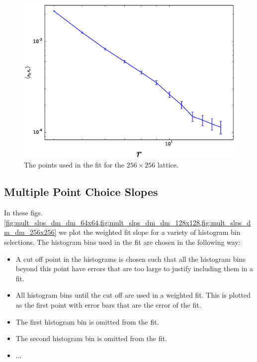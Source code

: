 \documentclass[aps,floatfix,11pt]{revtex4-1}
\begin{document}
\begin{figure}[h]
    \centering
    \includegraphics[width=8.5 cm]{fit_dm_dm_horz_ln_pnts_256x256}
    \caption{The points used in the fit for the $256\times256$ lattice.\label{fig:fit_dm_dm_256x256}}
\end{figure}

\subsection{Multiple Point Choice Slopes}
In these figs. \ref{fig:mult_slps_dm_dm_64x64,fig:mult_slps_dm_dm_128x128,fig:mult_slps_dm_dm_256x256}
we plot the weighted fit slope for a variety of histogram bin selections. The
histogram bins used in the fit are chosen in the following way:

\begin{itemize}
    \item A cut off point in the histograms is chosen such that all the histogram bins beyond this
        point have errors that are too large to justify including them in a fit.
    \item All histogram bins until the cut off are used in a weighted fit. This is plotted as the first
        point with error bars that are the error of the fit.
    \item The first histogram bin is omitted from the fit.
    \item The second histogram bin is omitted from the fit.
    \item ...
\end{itemize}
\end{document}
